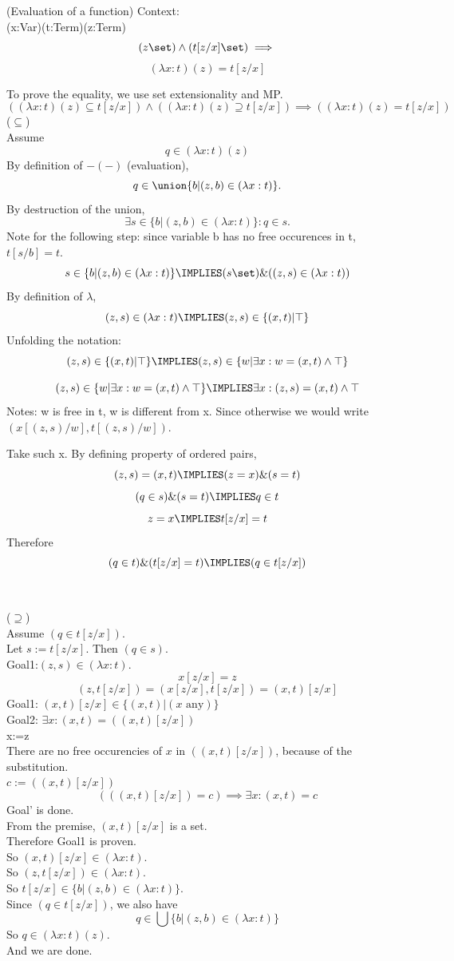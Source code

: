 \begin{theorem}(Evaluation of a function)
Context:\\
(x:Var)(t:Term)(z:Term)
\[
(z\set) \land (t[z/x]\set) \implies
\]
\[
(\lambda x: t)(z) = t[z/x]
\]
\end{theorem}
\Proof
To prove the equality, we use set extensionality and MP.
\[
((\lambda x: t)(z) \subseteq t[z/x] )
\land
((\lambda x: t)(z) \supseteq t[z/x] )
\implies
((\lambda x: t)(z) = t[z/x] )
\]
($\subseteq$)\\
Assume 
\[
q\in (\lambda x: t)(z)
\]
By definition of $-(-)$ (evaluation),
\[
q\in\union \{b|(z,b)\in(\lambda x:t)\}.
\]
By destruction of the union,
\[
\exists s\in \{b|(z,b)\in(\lambda x:t)\}: q\in s.
\]
Note for the following step: since variable b has no free occurences in t, $t[s/b]=t$.
\[
s\in \{b|(z,b)\in(\lambda x:t)\}
\IMPLIES
(s\set) \& ((z,s)\in(\lambda x:t))
\]
By definition of $\lambda$,
\[
(z,s)\in(\lambda x:t)
\IMPLIES
(z,s)\in \{(x,t)|\top\}
\]
Unfolding the notation:
\[
(z,s)\in \{(x,t)|\top\}
\IMPLIES
(z,s)\in \{w|\exists x: w = (x,t) \land \top\}
\]

\[
(z,s)\in \{w|\exists x: w = (x,t) \land \top\}
\IMPLIES
\exists x: (z,s) = (x,t) \land \top
\]
Notes: w is free in t, w is different from x. Since otherwise we would write $(x[(z,s)/w],t[(z,s)/w])$.

Take such x. By defining property of ordered pairs,
\[
(z,s) = (x,t)
\IMPLIES
(z=x) \& (s=t)
\]
\[
(q\in s)\& (s=t)
\IMPLIES
q\in t
\]
\[
z=x
\IMPLIES
t[z/x]=t
\]
Therefore
\[
(q\in t) \& (t[z/x]=t)
\IMPLIES
(q \in t[z/x])
\]
\ \\
\ \\
($\supseteq$)\\
Assume $(q \in t[z/x])$.\\
Let $s:=t[z/x]$. Then $(q\in s)$.\\
Goal1:$(z,s)\in(\lambda x:t)$.\\
\[
x[z/x]=z
\]
\[
(z,t[z/x]) = (x[z/x],t[z/x])=(x,t)[z/x]
\]
Goal1: $(x,t)[z/x]\in\{(x,t)|(x\mbox{ any})\}$\\
Goal2: $\exists x:(x,t)=((x,t)[z/x])$\\
x:=z\\
There are no free occurencies of $x$ in $((x,t)[z/x])$, because of the substitution.\\
$c:=((x,t)[z/x])$\\
\[
(((x,t)[z/x])=c)\implies\exists x: (x,t)=c
\]
Goal' is done.\\

From the premise, $(x,t)[z/x]$ is a set.\\
Therefore Goal1 is proven.\\
So $(x,t)[z/x]\in (\lambda x:t)$.\\
So $(z,t[z/x])\in (\lambda x:t)$.\\
So $t[z/x]\in \{b|(z,b)\in(\lambda x:t)\}$.\\
Since $(q \in t[z/x])$, we also have
\[
q\in \bigcup \{b|(z,b)\in(\lambda x: t)\}
\]
So $q\in (\lambda x: t)(z)$.\\
And we are done.\\
\Done


